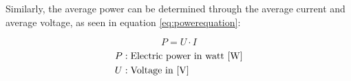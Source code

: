 Similarly, the average power can be determined through the average current and average voltage, as seen in equation \ref{eq:powerequation}:

\begin{equation}\label{eq:powerequation}
    P = U \cdot I
\end{equation}
\begin{align*}
    P &: \text{Electric power in watt [\unit{\W}]}\\
    U &: \text{Voltage in [\unit{\V}]}
\end{align*}